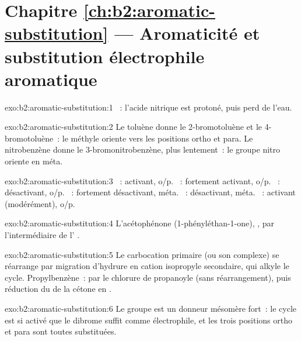 \section*{Chapitre \ref{ch:b2:aromatic-substitution} --- Aromaticité et substitution électrophile aromatique}

\begin{solution}{exo:b2:aromatic-substitution:1}
~: l'acide nitrique est protoné, puis perd de l'eau.
\end{solution}

\begin{solution}{exo:b2:aromatic-substitution:2}
Le toluène donne le 2-bromotoluène et le 4-bromotoluène~: le méthyle oriente vers les positions
ortho et para. Le nitrobenzène donne le 3-bromonitrobenzène, plus lentement~: le groupe nitro
oriente en méta.
\end{solution}

\begin{solution}{exo:b2:aromatic-substitution:3}
~: activant, o/p. ~: fortement activant, o/p. ~: désactivant, o/p.
~: fortement désactivant, méta. ~: désactivant, méta. ~:
activant (modérément), o/p.
\end{solution}

\begin{solution}{exo:b2:aromatic-substitution:4}
L'acétophénone (1-phényléthan-1-one), , par l'intermédiaire de l' .
\end{solution}

\begin{solution}{exo:b2:aromatic-substitution:5}
Le carbocation primaire (ou son complexe) se réarrange par migration d'hydrure en cation
isopropyle secondaire, qui alkyle le cycle. Propylbenzène~:  par le
chlorure de propanoyle (sans réarrangement), puis réduction du  de la cétone en .
\end{solution}

\begin{solution}{exo:b2:aromatic-substitution:6}
Le groupe  est un donneur mésomère fort~: le cycle est si activé que le dibrome
suffit comme électrophile, et les trois positions ortho et para sont toutes substituées.
\end{solution}

